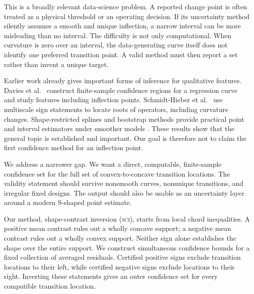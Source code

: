 \documentclass{interact}
\theoremstyle{definition}
\theoremstyle{remark}
\newcommand{\SCI}{\textnormal{\textsc{sci}}\xspace}
\begin{document}
This is a broadly relevant data-science problem.  A reported change point is
often treated as a physical threshold or an operating decision.  If its
uncertainty method silently assumes a smooth and unique inflection, a narrow
interval can be more misleading than no interval.  The difficulty is not only
computational.  When curvature is zero over an interval, the data-generating
curve itself does not identify one preferred transition point.  A valid method
must then report a set rather than invent a unique target.

Earlier work already gives important forms of inference for qualitative
features.  Davies et al.~\citep{davies2009nonparametric} construct finite-sample confidence
regions for a regression curve and study features including inflection points.
Schmidt-Hieber et al.~\citep{schmidthieber2013multiscale} use multiscale sign statements to locate
roots of operators, including curvature changes.  Shape-restricted splines and
bootstrap methods provide practical point and interval estimators under smoother
models \citep{meyer2008inference,liao2017changepoint}.  These results show that
the general topic is established and important.  Our goal is therefore not to
claim the first confidence method for an inflection point.

We address a narrower gap.  We want a direct, computable, finite-sample
confidence set for the full set of convex-to-concave transition locations.  The
validity statement should survive nonsmooth curves, nonunique transitions, and
irregular fixed designs.  The output should also be usable as an uncertainty
layer around a modern S-shaped point estimate.

Our method, shape-contrast inversion (\SCI), starts from local chord
inequalities.  A positive mean contrast rules out a wholly concave support; a
negative mean contrast rules out a wholly convex support.  Neither sign alone
establishes the shape over the entire support.  We construct simultaneous confidence
bounds for a fixed collection of averaged residuals.  Certified positive signs
exclude transition locations to their left, while certified negative signs
exclude locations to their right.  Inverting these statements gives an outer
confidence set for every compatible transition location.
\end{document}
